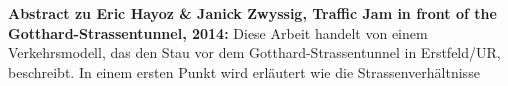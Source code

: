 \textbf{Abstract zu Eric Hayoz \& Janick Zwyssig, Traffic Jam in front of the Gotthard-Strassentunnel, 2014:}
Diese Arbeit handelt von einem Verkehrsmodell, das den Stau vor dem Gotthard-Strassentunnel in Erstfeld/UR, beschreibt. In einem ersten Punkt wird erläutert wie die Strassenverhältnisse 